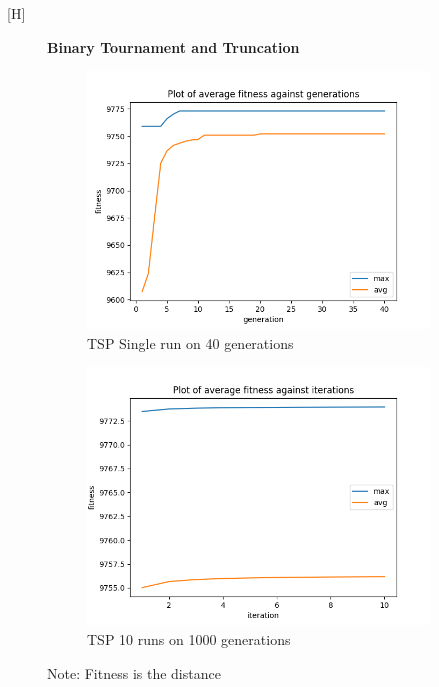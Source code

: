\documentclass[a4paper]{exam}
\begin{document}
\begin{questions}
  [H]

  \newpage
  \begin{figure}[H]
    \centering
    \textbf{Binary Tournament and Truncation}
    \begin{subfigure}{.5\textwidth}
      \centering
      \includegraphics[width=1\linewidth]{images/ks_bt_tn_gen.png}
      \caption{TSP Single run on 40 generations}
      \label{fig:ks_bt_tn_sub1}
    \end{subfigure}%
    \begin{subfigure}{.5\textwidth}
      \centering
      \includegraphics[width=1\linewidth]{images/ks_bt_tn_itr.png}
      \caption{TSP 10 runs on 1000 generations}
      \label{fig:ks_bt_tn_sub2}
    \end{subfigure}
    \caption{Note: Fitness is the distance}
    \label{fig:ks_bt_tn}
  \end{figure}


\end{questions}
\end{document}
